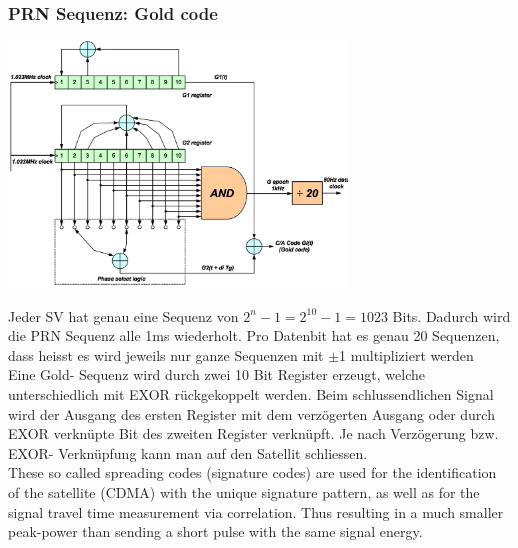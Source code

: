	\subsubsection{PRN Sequenz: Gold code}
		\begin{minipage}{9.5cm}
        	\includegraphics[width=9cm]{./bilder/GPS-Gold.png}
        \end{minipage}
		\begin{minipage}{8.5cm}
        	Jeder SV hat genau eine Sequenz
        	von $2^n-1=2^{10}-1=1023$ Bits. Dadurch wird die PRN Sequenz alle
        	1ms wiederholt. Pro Datenbit hat es genau 20 Sequenzen, dass heisst es
        	wird jeweils nur ganze Sequenzen mit $\pm$1 multipliziert werden\\
        	Eine Gold- Sequenz wird durch zwei 10 Bit Register erzeugt, welche
        	unterschiedlich mit EXOR rückgekoppelt werden. Beim schlussendlichen
        	Signal wird der Ausgang des ersten Register mit dem verzögerten
        	Ausgang oder durch EXOR verknüpte Bit des zweiten Register verknüpft.
        	Je nach Verzögerung bzw. EXOR- Verknüpfung kann man auf den Satellit
        	schliessen. \\
			These so called spreading codes (signature codes) are used for the identification 
			of the satellite (CDMA) with the unique signature pattern, as well as for the signal
			travel time measurement via correlation. Thus resulting in a much smaller peak-power 
			than sending a short pulse with the same signal energy.
        \end{minipage}
			
